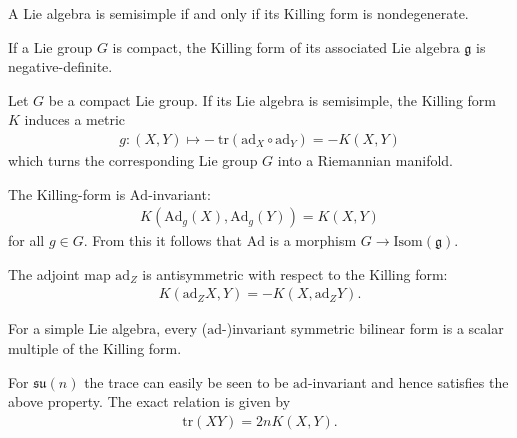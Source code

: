     \begin{theorem}
        A Lie algebra is semisimple if and only if its Killing form is nondegenerate.
    \end{theorem}

    \begin{property}
        If a Lie group $G$ is compact, the Killing form of its associated Lie algebra $\mathfrak{g}$ is negative-definite.
    \end{property}
    \begin{result}
        Let $G$ be a compact Lie group. If its Lie algebra is semisimple, the Killing form $K$ induces a metric
        \begin{gather}
            g:(X,Y)\mapsto -\ \text{tr}(\text{ad}_X\circ\text{ad}_Y) = -K(X,Y)
        \end{gather}
        which turns the corresponding Lie group $G$ into a Riemannian manifold.
    \end{result}

    \begin{property}
        The Killing-form is $\text{Ad}$-invariant:
        \begin{gather}
            K(\text{Ad}_g(X),\text{Ad}_g(Y)) = K(X,Y)
        \end{gather}
        for all $g\in G$. From this it follows that $\text{Ad}$ is a morphism $G\rightarrow\text{Isom}(\mathfrak{g})$.
    \end{property}
    \begin{result}
        The adjoint map $\text{ad}_Z$ is antisymmetric with respect to the Killing form:
        \begin{gather}
            \label{lie:ad_killing_form}
            K(\text{ad}_ZX,Y) = -K(X,\text{ad}_ZY).
        \end{gather}
    \end{result}

    \begin{property}\label{lie:killing_trace}
        For a simple Lie algebra, every ($\text{ad}$-)invariant symmetric bilinear form is a scalar multiple of the Killing form.
    \end{property}
    \begin{example}
        For $\mathfrak{su}(n)$ the trace can easily be seen to be $\text{ad}$-invariant and hence satisfies the above property. The exact relation is given by
        \begin{gather}
            \text{tr}(XY) = 2nK(X,Y).
        \end{gather}
    \end{example}


